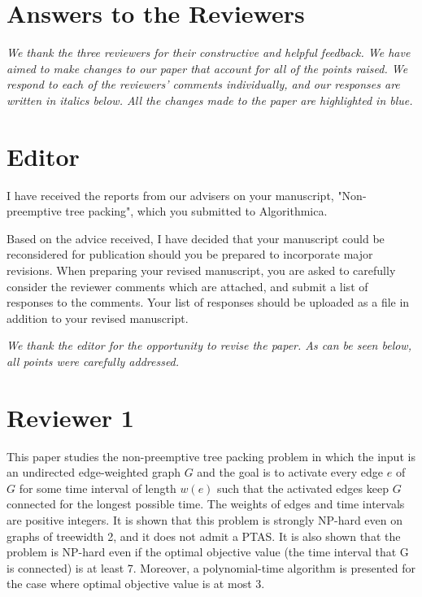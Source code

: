 \documentclass[11pt,a4paper]{article}
\begin{document}
\section*{Answers to the Reviewers}

\textit{We thank the three reviewers for their constructive and helpful feedback. We have aimed to make changes to our paper that account for all of the points raised. We respond to each of the reviewers' comments individually, and our responses are written in italics below. All the changes made to the paper are highlighted in blue.}

\section*{Editor}


I have received the reports from our advisers on your manuscript, "Non-preemptive tree packing", which you submitted to Algorithmica.

Based on the advice received, I have decided that your manuscript could be reconsidered for publication should you be prepared to incorporate major revisions.
When preparing your revised manuscript, you are asked to carefully consider the reviewer comments which are attached, and submit a list of responses to the comments. Your list of responses should be uploaded as a file in addition to your revised manuscript.


\textit{We thank the editor for the opportunity to revise the paper. As can be seen below, all points were carefully addressed.}


\section*{Reviewer 1}


This paper studies the non-preemptive tree packing problem in which the input is an undirected edge-weighted graph $G$ and the goal is to activate every edge $e$ of $G$ for some time interval of length $w(e)$ such that the activated edges keep $G$ connected for the longest possible time. The weights of edges and time intervals are positive integers. It is shown that this problem is strongly NP-hard even on graphs of treewidth 2, and it does not admit a PTAS. It is also shown that the problem is NP-hard even if the optimal objective value (the time interval that G is connected) is at least 7. Moreover, a polynomial-time algorithm is presented for the case where optimal objective value is at most 3.
\end{document}
